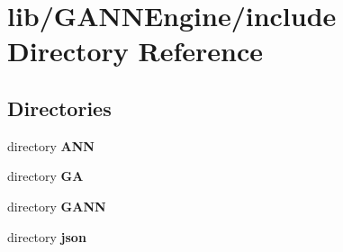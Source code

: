 \section{lib/\+G\+A\+N\+N\+Engine/include Directory Reference}
\label{dir_69861216e4290b129a795a207c079e83}
\subsection*{Directories}
\begin{DoxyCompactItemize}
\item 
directory {\bf A\+N\+N}
\item 
directory {\bf G\+A}
\item 
directory {\bf G\+A\+N\+N}
\item 
directory {\bf json}
\end{DoxyCompactItemize}
